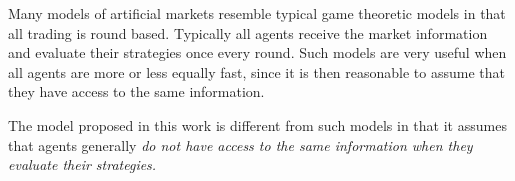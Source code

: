 Many models of artificial markets resemble typical game theoretic models in that all trading is round based. Typically all agents receive the market information and evaluate their strategies once every round. Such models are very useful when all agents are more or less equally fast, since it is then reasonable to assume that they have access to the same information. 

The model proposed in this work is different from such models in that it assumes that agents generally \it{do not} have access to the same information when they evaluate their strategies. 